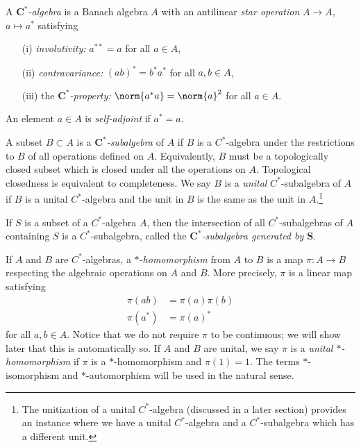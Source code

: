 \begin{definition}
A \emph{$\boldsymbol{C^*}$-algebra} is a Banach algebra $A$ with an antilinear \emph{star operation} $A \rightarrow A$, $a \mapsto a^*$ satisfying
\begin{enumerate}
	\item[(i)] \emph{involutivity:} $a^{**} = a$ for all $a \in A$,
	\item[(ii)] \emph{contravariance:} $(ab)^* = b^*a^*$ for all $a, b \in A$,
	\item[(iii)] the \emph{$\boldsymbol{C^*}$-property:} $\norm{a^*a} = \norm{a}^2$ for all $a \in A$.
\end{enumerate} 
An element $a \in A$ is \emph{self-adjoint} if $a^* = a$.

A subset $B \subset A$ is a \emph{$\boldsymbol{C^*}$-subalgebra} of $A$ if $B$ is a $C^*$-algebra under the restrictions to $B$ of all operations defined on $A$. Equivalently, $B$ must be a topologically closed subset which is closed under all the operations on $A$. Topological closedness is equivalent to completeness. We say $B$ is a \emph{unital} $C^*$-subalgebra of $A$ if $B$ is a unital $C^*$-algebra and the unit in $B$ is the same as the unit in $A$.\footnote{The unitization of a unital $C^*$-algebra (discussed in a later section) provides an instance where we have a unital $C^*$-algebra and a $C^*$-subalgebra which has a different unit.}

If $S$ is a subset of a $C^*$-algebra $A$, then the intersection of all $C^*$-subalgebras of $A$ containing $S$ is a $C^*$-subalgebra, called the \emph{$\boldsymbol{C^*}$-subalgebra generated by $\boldsymbol{S}$}.

If $A$ and $B$ are $C^*$-algebras, a \emph{$\boldsymbol{*}$-homomorphism} from $A$ to $B$ is a map $\pi:A \rightarrow B$ respecting the algebraic operations on $A$ and $B$. More precisely, $\pi$ is a linear map satisfying
\begin{equation}
\begin{aligned}
\pi(ab) &= \pi(a)\pi(b)\\
\pi(a^*) &= \pi(a)^*
\end{aligned}
\end{equation}
for all $a, b \in A$. Notice that we do not require $\pi$ to be continuous; we will show later that this is automatically so. If $A$ and $B$ are unital, we say $\pi$ is a \emph{unital $\boldsymbol{*}$-homomorphism} if $\pi$ is a $*$-homomorphism and $\pi(1) = 1$. The terms $*$-isomorphism and $*$-automorphism will be used in the natural sense. 
\end{definition}

